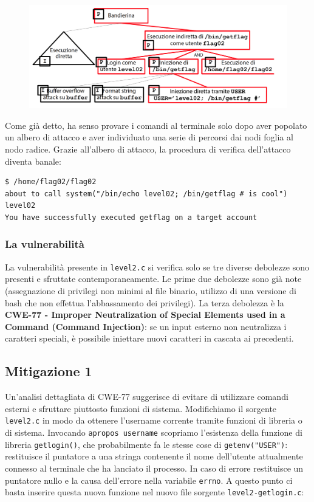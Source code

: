 \begin{figure}[hbpt!]
    \centering
    \includegraphics[width=0.8 \textwidth]{./Images/cap5/5.9.png}
\end{figure}
\FloatBarrier

Come già detto, ha senso provare i comandi al
terminale solo dopo aver popolato un albero di attacco e aver individuato una serie di percorsi dai nodi
foglia al nodo radice. Grazie all'albero di attacco, la procedura di verifica dell'attacco diventa banale:

\begin{mdframed}[backgroundcolor=white!20,shadow=false]
\begin{lstlisting}
$ /home/flag02/flag02
about to call system("/bin/echo level02; /bin/getflag # is cool")
level02
You have successfully executed getflag on a target account
\end{lstlisting}
\end{mdframed}

\subsubsection{La vulnerabilità}

La vulnerabilità presente in \texttt{level2.c} si verifica solo se tre diverse debolezze sono presenti e sfruttate contemporaneamente. Le prime due debolezze sono già note (assegnazione di privilegi non minimi al file binario, utilizzo di una versione di bash che non effettua l'abbassamento dei privilegi). La terza debolezza è la \textbf{CWE-77 - Improper Neutralization of Special Elements used in a Command (Command Injection)}: se un input esterno non neutralizza i caratteri speciali, è possibile iniettare nuovi caratteri in cascata ai precedenti.

\subsection{Mitigazione 1}
Un'analisi dettagliata di CWE-77 suggerisce di evitare di utilizzare comandi esterni e sfruttare piuttosto funzioni di sistema. Modifichiamo il sorgente \texttt{level2.c} in modo da ottenere l'username corrente tramite funzioni di libreria o di sistema. Invocando \texttt{apropos username} scopriamo l'esistenza della funzione di libreria \texttt{getlogin()}, che probabilmente fa le stesse cose di \texttt{getenv("USER")}: restituisce il puntatore a una stringa contenente il nome dell'utente attualmente connesso al terminale che ha lanciato il processo. In caso di errore restituisce un puntatore nullo e la causa dell'errore nella variabile \texttt{errno}. A questo punto ci basta inserire questa nuova funzione nel nuovo file sorgente \texttt{level2-getlogin.c}:

